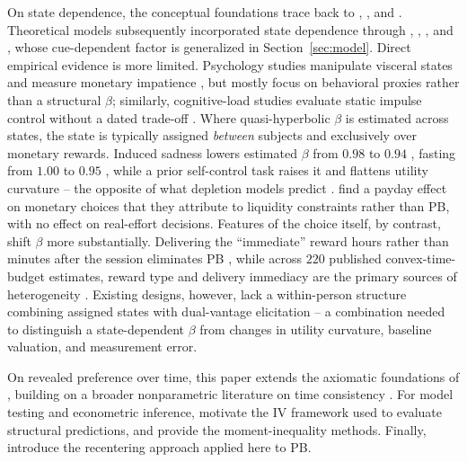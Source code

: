\documentclass[11pt,a4paper]{article}
\theoremstyle{plain}
\theoremstyle{definition}
\begin{document}
On state dependence, the conceptual foundations trace back to \citet{loewenstein1996}, \citet{lor2003}, and \citet{kruegeluhl2023}. Theoretical models subsequently incorporated state dependence through \citet{laibson2001}, \citet{bernheimrangel2004}, \citet{fudenberg2006}, and \citet{pennesi2020}, whose cue-dependent factor is generalized in Section~\ref{sec:model}. %
Direct empirical evidence is more limited.
Psychology studies manipulate visceral states and measure monetary impatience \citep[e.g.,][]{badger2007,sayette2008,kimzauberman2013,skrynka2019}, but mostly focus on behavioral proxies rather than a structural $\beta$; similarly, cognitive-load studies evaluate static impulse control without a dated trade-off \citep{shiv1999,wardmann2000}.
Where quasi-hyperbolic $\beta$ is estimated across states, the state is typically assigned \emph{between} subjects and exclusively over monetary rewards. Induced sadness lowers estimated $\beta$ from $0.98$ to $0.94$ \citep{lerner2013}, fasting from $1.00$ to $0.95$ \citep{ashton2015}, while a prior self-control task raises it and flattens utility curvature -- the opposite of what depletion models predict \citep{kuhn2017}.
\citet{carvalho2016} find a payday effect on monetary choices that they attribute to liquidity constraints rather than PB, with no effect on real-effort decisions.
Features of the choice itself, by contrast, shift $\beta$ more substantially. Delivering the ``immediate'' reward hours rather than minutes after the session eliminates PB \citep{balakrishnan2020}, while across $220$ published convex-time-budget estimates, reward type and delivery immediacy are the primary sources of heterogeneity \citep{imai2021}. Existing designs, however, lack a within-person structure combining assigned states with dual-vantage elicitation -- a combination needed to distinguish a state-dependent $\beta$ from changes in utility curvature, baseline valuation, and measurement error.

On revealed preference over time, this paper extends the axiomatic 
foundations of \citet{eis2020}, building on a broader nonparametric literature on time consistency \citep{halevy2015,browning1989,crawford2010,adams2014,bbc2021,aguiar2021}. %
For model testing and econometric 
inference, \citet{adaocostinotdonaldson2024} motivate the IV framework used to evaluate structural predictions, \citet{arp2023} and \citet{coxshi2023} provide the moment-inequality methods.
Finally, \citet{borusyak2023,borusyakhull2026} 
introduce the recentering approach applied here to PB.
\end{document}
